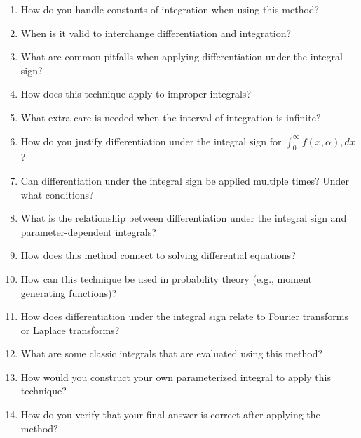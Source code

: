 \begin{enumerate}
  \item How do you handle constants of integration when using this method?
  \item When is it valid to interchange differentiation and integration?
  \item What are common pitfalls when applying differentiation under the integral sign?
  \item How does this technique apply to improper integrals?
  \item What extra care is needed when the interval of integration is infinite?
  \item How do you justify differentiation under the integral sign for $\int_0^\infty f(x,\alpha),dx$?
  \item Can differentiation under the integral sign be applied multiple times? Under what conditions?
  \item What is the relationship between differentiation under the integral sign and parameter-dependent integrals?
  \item How does this method connect to solving differential equations?
  \item How can this technique be used in probability theory (e.g., moment generating functions)?
  \item How does differentiation under the integral sign relate to Fourier transforms or Laplace transforms?
  \item What are some classic integrals that are evaluated using this method?
  \item How would you construct your own parameterized integral to apply this technique?
  \item How do you verify that your final answer is correct after applying the method?
\end{enumerate}
